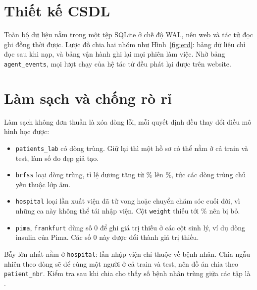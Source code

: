 \section{Thiết kế CSDL}

Toàn bộ dữ liệu nằm trong một tệp SQLite ở chế độ WAL, nên web và tác tử đọc ghi đồng thời được. Lược đồ chia hai nhóm như Hình~\ref{fig:erd}: bảng dữ liệu chỉ đọc sau khi nạp, và bảng vận hành ghi lại mọi phiên làm việc. Nhờ bảng \texttt{agent\_events}, mọi lượt chạy của hệ tác tử đều phát lại được trên website.



\section{Làm sạch và chống rò rỉ}

Làm sạch không đơn thuần là xóa dòng lỗi, mỗi quyết định đều thay đổi điều mô hình học được:

\begin{itemize}
  \item \texttt{patients\_lab} có  dòng trùng. Giữ lại thì một hồ sơ có thể nằm ở cả train và test, làm số đo đẹp giả tạo.
  \item \texttt{brfss} loại  dòng trùng, tỉ lệ dương tăng từ \% lên \%, tức các dòng trùng chủ yếu thuộc lớp âm.
  \item \texttt{hospital} loại  lần xuất viện đã tử vong hoặc chuyển chăm sóc cuối đời, vì những ca này không thể tái nhập viện. Cột \texttt{weight} thiếu tới \% nên bị bỏ.
  \item \texttt{pima}, \texttt{frankfurt} dùng số 0 để ghi giá trị thiếu ở các cột sinh lý, ví dụ  dòng insulin của Pima. Các số 0 này được đổi thành giá trị thiếu.
\end{itemize}

Bẫy lớn nhất nằm ở \texttt{hospital}:  lần nhập viện chỉ thuộc về  bệnh nhân. Chia ngẫu nhiên theo dòng sẽ để cùng một người ở cả train và test, nên đồ án chia theo \texttt{patient\_nbr}. Kiểm tra sau khi chia cho thấy số bệnh nhân trùng giữa các tập là .

